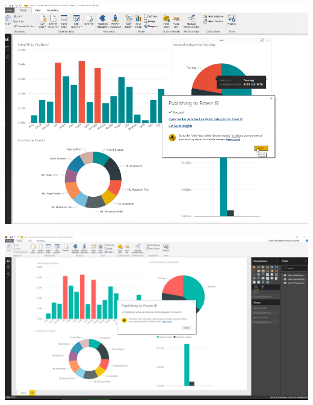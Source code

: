 	\begin{center}
	\includegraphics[width=15cm]{./Imagenes/img6}
	\end{center}

	\begin{center}
	\includegraphics[width=18cm]{./Imagenes/resultado}
	\end{center}

